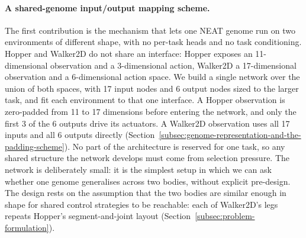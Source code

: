 \documentclass[12pt]{article}
\begin{document}
\paragraph{A shared-genome input/output mapping scheme.}
The first contribution is the mechanism that lets one NEAT genome run on two environments of different shape, with no per-task heads and no task conditioning.
Hopper and Walker2D do not share an interface: Hopper exposes an 11-dimensional observation and a 3-dimensional action, Walker2D a 17-dimensional observation and a 6-dimensional action space.
We build a single network over the union of both spaces, with 17 input nodes and 6 output nodes sized to the larger task, and fit each environment to that one interface.
A Hopper observation is zero-padded from 11 to 17 dimensions before entering the network, and only the first 3 of the 6 outputs drive its actuators. A Walker2D observation uses all 17 inputs and all 6 outputs directly (Section~\ref{subsec:genome-representation-and-the-padding-scheme}).
No part of the architecture is reserved for one task, so any shared structure the network develops must come from selection pressure.
The network is deliberately small: it is the simplest setup in which we can ask whether one genome generalises across two bodies, without explicit pre-design.
The design rests on the assumption that the two bodies are similar enough in shape for shared control strategies to be reachable: each of Walker2D's legs repeats Hopper's segment-and-joint layout (Section~\ref{subsec:problem-formulation}).
\end{document}
